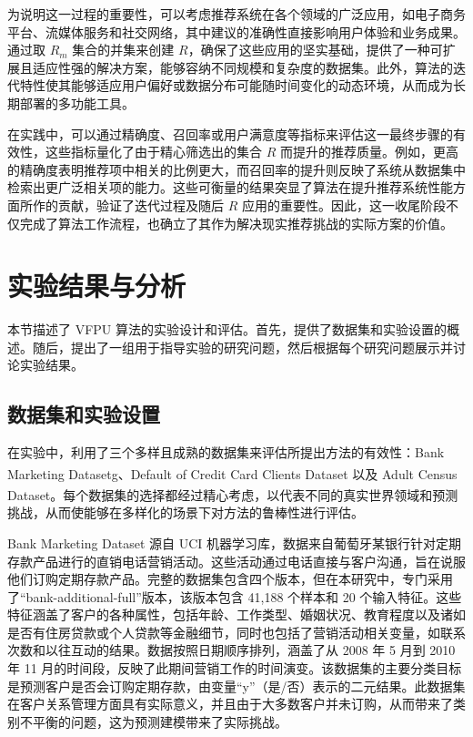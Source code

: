为说明这一过程的重要性，可以考虑推荐系统在各个领域的广泛应用，如电子商务平台、流媒体服务和社交网络，其中建议的准确性直接影响用户体验和业务成果。通过取 ${{R}_{m}}$ 集合的并集来创建 $R$，确保了这些应用的坚实基础，提供了一种可扩展且适应性强的解决方案，能够容纳不同规模和复杂度的数据集。此外，算法的迭代特性使其能够适应用户偏好或数据分布可能随时间变化的动态环境，从而成为长期部署的多功能工具。

在实践中，可以通过精确度、召回率或用户满意度等指标来评估这一最终步骤的有效性，这些指标量化了由于精心筛选出的集合 $R$ 而提升的推荐质量。例如，更高的精确度表明推荐项中相关的比例更大，而召回率的提升则反映了系统从数据集中检索出更广泛相关项的能力。这些可衡量的结果突显了算法在提升推荐系统性能方面所作的贡献，验证了迭代过程及随后 $R$ 应用的重要性。因此，这一收尾阶段不仅完成了算法工作流程，也确立了其作为解决现实推荐挑战的实际方案的价值。  

\section{实验结果与分析}
本节描述了 VFPU 算法的实验设计和评估。首先，提供了数据集和实验设置的概述。随后，提出了一组用于指导实验的研究问题，然后根据每个研究问题展示并讨论实验结果。
\subsection{数据集和实验设置}
在实验中，利用了三个多样且成熟的数据集来评估所提出方法的有效性：Bank Marketing Datasetg\textsuperscript{\cite{fitriani2021data}}、Default of Credit Card Clients Dataset\textsuperscript{\cite{subasi2019prediction}} 以及 Adult Census Dataset\textsuperscript{\cite{chakrabarty2018statistical}}。每个数据集的选择都经过精心考虑，以代表不同的真实世界领域和预测挑战，从而使能够在多样化的场景下对方法的鲁棒性进行评估。

Bank Marketing Dataset 源自 UCI 机器学习库，数据来自葡萄牙某银行针对定期存款产品进行的直销电话营销活动。这些活动通过电话直接与客户沟通，旨在说服他们订购定期存款产品。完整的数据集包含四个版本，但在本研究中，专门采用了“bank-additional-full”版本，该版本包含 41,188 个样本和 20 个输入特征。这些特征涵盖了客户的各种属性，包括年龄、工作类型、婚姻状况、教育程度以及诸如是否有住房贷款或个人贷款等金融细节，同时也包括了营销活动相关变量，如联系次数和以往互动的结果。数据按照日期顺序排列，涵盖了从 2008 年 5 月到 2010 年 11 月的时间段，反映了此期间营销工作的时间演变。该数据集的主要分类目标是预测客户是否会订购定期存款，由变量“y”（是/否）表示的二元结果。此数据集在客户关系管理方面具有实际意义，并且由于大多数客户并未订购，从而带来了类别不平衡的问题，这为预测建模带来了实际挑战。

